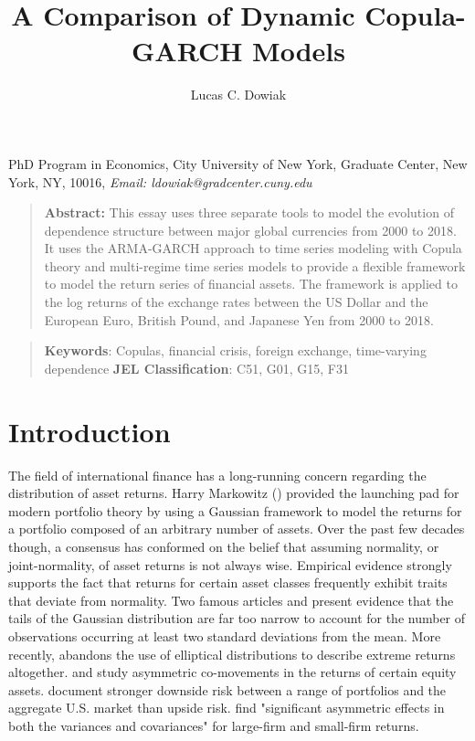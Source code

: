\documentclass[12pt]{article}
\title{A Comparison of Dynamic Copula-GARCH Models}
\author{Lucas C. Dowiak}
\begin{document}
 
\maketitle{}
 
PhD Program in Economics, City University of New York\smallskip, Graduate Center,
New York, NY, 10016, \textit{Email: ldowiak@gradcenter.cuny.edu}

\qquad

\begin{quotation}
\textbf{Abstract:} This essay uses three separate tools to model the evolution of dependence structure between major global currencies from 2000 to 2018. It uses the ARMA-GARCH approach to time series modeling with Copula theory and multi-regime time series models to provide a flexible framework to model the return series of financial assets. The framework is applied to the log returns of the exchange rates between the US Dollar and the European Euro, British Pound, and Japanese Yen from 2000 to 2018.
\end{quotation}

\vspace{1pt}

\begin{quotation}
\textbf{Keywords}: Copulas, financial crisis, foreign exchange, time-varying dependence
\textbf{JEL Classification}: C51, G01, G15, F31
\end{quotation}

\vspace{1pt}

\section{Introduction}

The field of international finance has a long-running concern regarding the distribution of asset returns. Harry Markowitz (\cite{Markowitz_1952, Markowitz_1959}) provided the launching pad for modern portfolio theory by using a Gaussian framework to model the returns for a portfolio composed of an arbitrary number of assets. Over the past few decades though, a consensus has conformed on the belief that assuming normality, or joint-normality, of asset returns is not always wise. Empirical evidence strongly supports the fact that returns for certain asset classes frequently exhibit traits that deviate from normality. Two famous articles \cite{Mandelbrot_1963} and \cite{Fama_1965} present evidence that the tails of the Gaussian distribution are far too narrow to account for the number of observations occurring at least two standard deviations from the mean. More recently, \cite{Longin_1996} abandons the use of elliptical distributions to describe extreme returns altogether. \cite{Ang_and_Chen_2002} and \cite{Kroner_and_Ng_1998} study asymmetric co-movements in the returns of certain equity assets. \cite{Ang_and_Chen_2002} document stronger downside risk between a range of portfolios and the aggregate U.S. market than upside risk. \cite{Kroner_and_Ng_1998} find "significant asymmetric effects in both the variances and covariances" for large-firm and small-firm returns.
\end{document}
